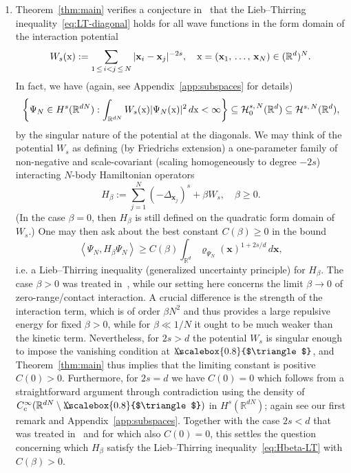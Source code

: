 \documentclass[AHL, Unicode, longabstracts, published]{cedram}
\newcommand*\R {\mathbb{R}}
\newcommand\1{{\ensuremath {\mathds 1} }}
\newcommand{\bx}{\mathbf{x}}
\newcommand{\cH}{\mathcal{H}}
\newcommand{\sx}{\textup{x}}
\newcommand{\bDelta}{{\mbox{$\triangle$}\hspace{-8.6pt}\scalebox{0.8}{$\triangle$}}}
\begin{document}
\begin{enumerate}
\item Theorem~\ref{thm:main} verifies a conjecture in~\cite[p.~1362]{LunNamPor-16} that the Lieb--Thirring inequality~\eqref{eq:LT-diagonal} holds for all wave functions in the form domain of the interaction potential
\[
W_s(\sx) := \sum_{1\,\le\,i<j\,\le\,N} |\bx_i-\bx_j|^{-2s}, \quad \sx=(\bx_1,\,\ldots,\,\bx_N)\in (\R^d)^N.
\]
In fact, we have (again, see Appendix~\ref{app:subspaces} for details)
\begin{equation}\label{eq:interaction-form-domain}
\biggl\{\Psi_N\in H^s(\R^{dN}): \int_{\R^{dN}} W_s(\sx) |\Psi_N(\sx)|^2 \,d\sx < \infty \biggr\}
\subseteq \cH_0^{s,\,N}(\R^d)
\subseteq \cH^{s,\,N}(\R^d),
\end{equation}
by the singular nature of the potential at the diagonals. We may think of the potential $W_s$ as defining (by Friedrichs extension) a one-parameter family of non-negative and scale-covariant (scaling homogeneously to degree $-2s$) interacting $N$-body Hamiltonian operators
\[
H_\beta := \sum_{j=1}^N (-\Delta_{\bx_j})^s + \beta W_s,
\quad \beta \ge 0.
\]
(In the case $\beta=0$, then $H_\beta$ is still defined on the quadratic form domain of $W_s$.) One may then ask about the best constant $C(\beta)\ge 0$ in the bound
\begin{equation}\label{eq:Hbeta-LT}
\left\langle \Psi_N, H_\beta \Psi_N \right\rangle \ge C(\beta)\int_{\R^d}\varrho_{\Psi_N}(\bx)^{1+2s/d}\,d\bx,
\end{equation}
i.e. a Lieb--Thirring inequality (generalized uncertainty principle) for $H_\beta$. The case $\beta>0$ was treated in~\cite{LunPorSol-15,LunNamPor-16}, while our setting here concerns the limit $\beta \to 0$ of zero-range/contact interaction. A crucial difference is the strength of the interaction term, which is of order $\beta N^2$ and thus provides a large repulsive energy for fixed $\beta > 0$, while for $\beta \ll 1/N$ it ought to be much weaker than the kinetic term. Nevertheless, for $2s > d$ the potential $W_s$ is singular enough to impose the vanishing condition at $\bDelta$, and Theorem~\ref{thm:main} thus implies that the limiting constant is positive $C(0)>0$. Furthermore, for $2s=d$ we have $C(0)=0$ which follows from a straightforward argument through contradiction using the density of $C_c^\infty(\R^{dN}\setminus\bDelta)$ in $H^s(\R^{dN})$; again see our first remark and Appendix~\ref{app:subspaces}. Together with the case $2s<d$ that was treated in~\cite{LunNamPor-16} and for which also $C(0)=0$, this settles the question concerning which $H_\beta$ satisfy the Lieb--Thirring inequality~\eqref{eq:Hbeta-LT} with $C(\beta)>0$.




\end{enumerate}
\end{document}
